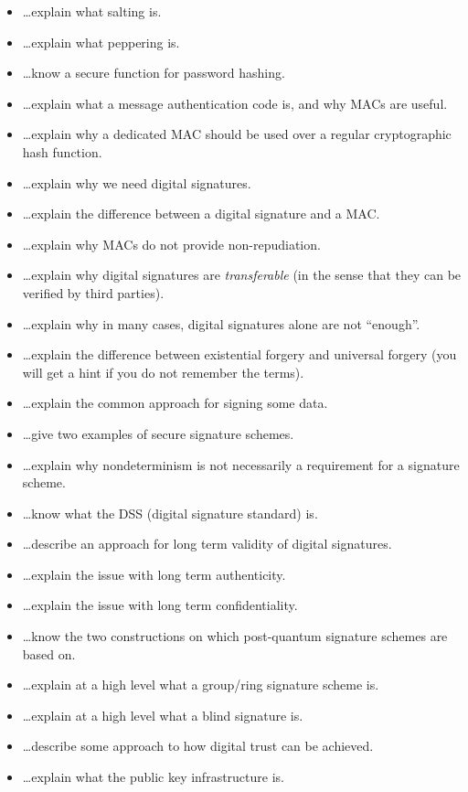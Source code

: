 \documentclass[usegeometry,parskip=half]{scrartcl}
\begin{document}
\begin{itemize}
  \item \dots{}explain what salting is.
  \item \dots{}explain what peppering is.
  \item \dots{}know a secure function for password hashing.
  \item \dots{}explain what a message authentication code is, and why MACs are useful.
  \item \dots{}explain why a dedicated MAC should be used over a regular cryptographic hash function.
  \item \dots{}explain why we need digital signatures.
  \item \dots{}explain the difference between a digital signature and a MAC.
  \item \dots{}explain why MACs do not provide non-repudiation.
  \item \dots{}explain why digital signatures are \emph{transferable} (in the sense that they can be verified by third parties).
  \item \dots{}explain why in many cases, digital signatures alone are not \enquote{enough}.
  \item \dots{}explain the difference between existential forgery and universal forgery (you will get a hint if you do not remember the terms).
  \item \dots{}explain the common approach for signing some data.
  \item \dots{}give two examples of secure signature schemes.
  \item \dots{}explain why nondeterminism is not necessarily a requirement for a signature scheme.
  \item \dots{}know what the DSS (digital signature standard) is.
  \item \dots{}describe an approach for long term validity of digital signatures.
  \item \dots{}explain the issue with long term authenticity.
  \item \dots{}explain the issue with long term confidentiality.
  \item \dots{}know the two constructions on which post-quantum signature schemes are based on.
  \item \dots{}explain at a high level what a group/ring signature scheme is.
  \item \dots{}explain at a high level what a blind signature is.
  \item \dots{}describe some approach to how digital trust can be achieved.
  \item \dots{}explain what the public key infrastructure is.

\end{itemize}
\end{document}

